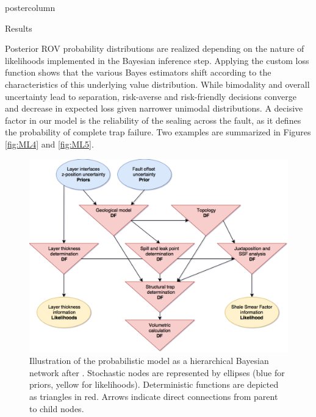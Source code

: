 \documentclass{beamer}
\begin{document}
\begin{frame}
\begin{columns}
\begin{column}{.618\textwidth}
\begin{beamercolorbox}[center]{postercolumn}
\begin{minipage}{.98\textwidth}
{					
\begin{myblock}{Results}
		\begin{minipage}[t]{0.48\textwidth}
					\vspace{0pt}
					Posterior ROV probability distributions are realized depending on the nature of likelihoods implemented in the Bayesian inference step. Applying the custom loss function shows that the various Bayes estimators shift according to the characteristics of this underlying	value distribution. While bimodality and overall uncertainty lead to separation, risk-averse and risk-friendly decisions converge and decrease in expected loss given narrower unimodal distributions. A decisive factor in our model is the reliability of the sealing across the fault, as it defines the probability of complete trap failure. Two examples are summarized in Figures \ref{fig:ML4} and \ref{fig:ML5}.
				\end{minipage}\hfill
				\begin{minipage}[t]{0.48\textwidth}
					\vspace{0em}
					\begin{figure}
					\centering
					\includegraphics[width=1\textwidth]{figures/model_network}
					\caption{Illustration of the probabilistic model as a hierarchical Bayesian network after \citet{koller2009probabilistic}. Stochastic nodes are represented by ellipses (blue for
					priors, yellow for likelihoods). Deterministic functions are depicted as triangles in
					red. Arrows indicate direct connections from parent to child nodes.}
					\label{fig:model_network}
					\end{figure}
					\vspace{0.5em}
				\end{minipage}
				

\end{myblock}}
\end{minipage}
\end{beamercolorbox}
\end{column}
\end{columns}
\end{frame}
\end{document}
